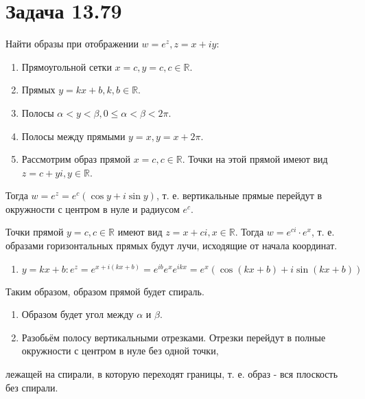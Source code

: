 \documentclass[11pt]{article}
\begin{document}
\section{Задача 13.79}
\label{sec:org7ffffac}
Найти образы при отображении \(w = e^z, z = x + iy\):
\begin{enumerate}
\item Прямоугольной сетки \(x = c, y = c, c \in \mathbb{R}\).
\item Прямых \(y = kx + b, k, b \in \mathbb{R}\).
\item Полосы \(\alpha < y < \beta, 0 \leq \alpha < \beta < 2\pi\).
\item Полосы между прямыми \(y = x, y = x + 2\pi\).

\item Рассмотрим образ прямой \(x = c, c \in \mathbb{R}\). Точки на этой прямой имеют вид \(z = c + yi, y \in \mathbb{R}\).
\end{enumerate}
Тогда \(w = e^z = e^c(\cos y + i\sin y)\), т. е. вертикальные прямые перейдут в окружности с центром в нуле и радиусом \(e^c\).

Точки прямой \(y = c, c \in \mathbb{R}\) имеют вид \(z = x + ci, x \in \mathbb{R}\). Тогда \(w = e^{ci}\cdot e^x\), т. е.
образами горизонтальных прямых будут лучи, исходящие от начала координат.
\begin{enumerate}
\item \(y = kx + b: e^z = e^{x + i(kx + b)} = e^{ib}e^xe^{ikx} = e^x(\cos(kx + b) + i\sin(kx + b))\)
\end{enumerate}

Таким образом, образом прямой будет спираль.
\begin{enumerate}
\item Образом будет угол между \(\alpha\) и \(\beta\).
\item Разобьём полосу вертикальными отрезками. Отрезки перейдут в полные окружности с центром в нуле без одной точки,
\end{enumerate}
лежащей на спирали, в которую переходят границы, т. е. образ - вся плоскость без спирали.
\end{document}
